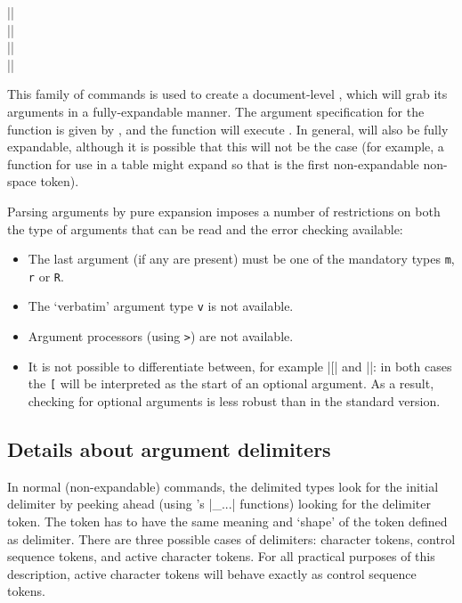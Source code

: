 \documentclass{ltxguide}
\begin{document}
\begin{decl}
  |\NewExpandableDocumentCommand|        \\
  |\RenewExpandableDocumentCommand|      \\
  |\ProvideExpandableDocumentCommand|    \\
  |\DeclareExpandableDocumentCommand|   
\end{decl}
This family of commands is used to create a document-level ,
which will grab its arguments in a fully-expandable manner. The
argument specification for the function is given by ,
and the function will execute . In  general,  will
also be fully expandable, although it is possible that this will
not be the case (for example, a function for use in a table might
expand so that  is the first non-expandable non-space token).

Parsing arguments by pure expansion imposes a number of restrictions on
both the type of arguments that can be read and the error checking
available:
\begin{itemize}
  \item The last argument (if any are present) must be one of the
    mandatory types \texttt{m}, \texttt{r} or \texttt{R}.
  \item The `verbatim' argument type \texttt{v} is not available.
  \item Argument processors (using \texttt{>}) are not available.
  \item It is not possible to differentiate between, for example
    |\foo[| and |\foo{[}|: in both cases the \texttt{[} will be
    interpreted as the start of an optional argument. As a
    result, checking for optional arguments is less robust than
    in the standard version.
\end{itemize}

\subsection{Details about argument delimiters}

In normal (non-expandable) commands, the delimited types look for the
initial delimiter by peeking ahead (using 's |\peek_...|
functions) looking for the delimiter token.  The token has to have the
same meaning and `shape' of the token defined as delimiter.
There are three possible cases of delimiters: character tokens, control
sequence tokens, and active character tokens.  For all practical purposes
of this description, active character tokens will behave exactly as
control sequence tokens.
\end{document}
